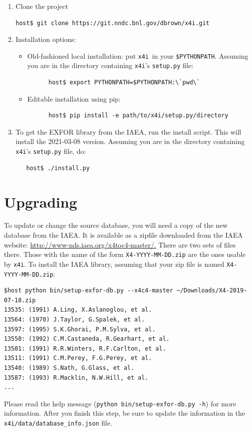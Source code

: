 \documentclass[11pt]{article}
\newcommand{\xfouri}{\texttt{x4i}}
\begin{document}
\begin{enumerate}
\item Clone the project
\begin{verbatim}
host$ git clone https://git.nndc.bnl.gov/dbrown/x4i.git
\end{verbatim}

\item Installation options:
  \begin{itemize}
    \item Old-fashioned local installation: put \xfouri\ in your \texttt{\$PYTHONPATH}.  Assuming you are in the directory containing \xfouri's \texttt{setup.py} file:
      \begin{verbatim}
      host$ export PYTHONPATH=$PYTHONPATH:\`pwd\`
      \end{verbatim}

    \item Editable installation using pip:
      \begin{verbatim}
      host$ pip install -e path/to/x4i/setup.py/directory
      \end{verbatim}
  \end{itemize}

\item To get the EXFOR library from the IAEA, run the install script.  This will install the 2021-03-08 version.  Assuming you are in the directory containing \xfouri's \texttt{setup.py} file, do:
  \begin{verbatim}
   host$ ./install.py
  \end{verbatim}
\end{enumerate}


\section{Upgrading}
To update or change the source database, you will need a copy of the new database from the IAEA.  It is available as a zipfile downloaded from the IAEA website: \url{http://www-nds.iaea.org/x4toc4-master/.}  There are two sets of files there.  Those with the name of the form \texttt{X4-YYYY-MM-DD.zip} are the ones usable by \xfouri.  To install the IAEA library, assuming that your zip file is named  \texttt{X4-YYYY-MM-DD.zip}:
\begin{verbatim}
$host python bin/setup-exfor-db.py --x4c4-master ~/Downloads/X4-2019-07-18.zip
13535: (1991) A.Ling, X.Aslanoglou, et al.
13564: (1970) J.Taylor, G.Spalek, et al.
13597: (1995) S.K.Ghorai, P.M.Sylva, et al.
13550: (1992) C.M.Castaneda, R.Gearhart, et al.
13501: (1991) R.R.Winters, R.F.Carlton, et al.
13511: (1991) C.M.Perey, F.G.Perey, et al.
13540: (1989) S.Nath, G.Glass, et al.
13587: (1993) R.Macklin, N.W.Hill, et al.
...
\end{verbatim}
Please read the help message (\texttt{python bin/setup-exfor-db.py -h}) for more information.  After you finish this step,
be sure to update the information in the \texttt{x4i/data/database\_info.json} file.
\end{document}
